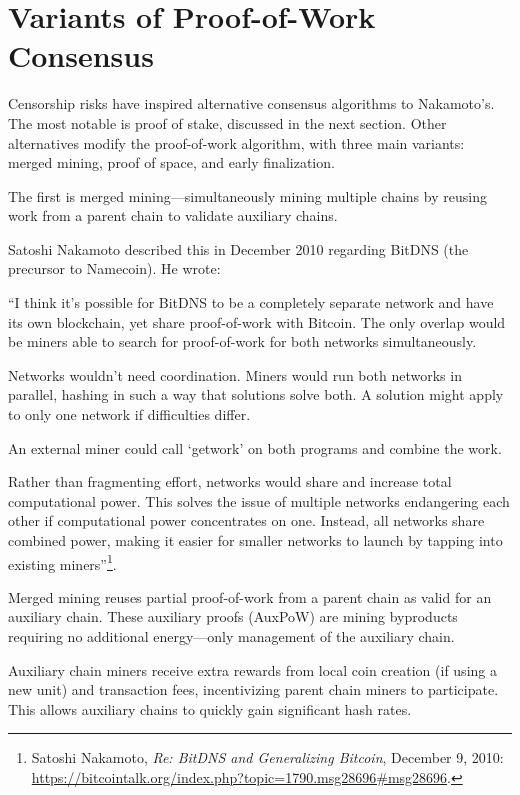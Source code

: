 \documentclass[
  a5paper,
  smalldemyvopaper,10pt,twoside,onecolumn,openright,extrafontsizes,hidelinks]{memoir}
\begin{document}
\section*{Variants of Proof-of-Work
Consensus}\label{les-variantes-des-consensus-par-preuve-de-travail}


Censorship risks have inspired alternative consensus algorithms to
Nakamoto's. The most notable is proof of stake, discussed in the next
section. Other alternatives modify the proof-of-work algorithm, with
three main variants: merged mining, proof of space, and early
finalization.

The first is merged mining---simultaneously mining multiple chains by
reusing work from a parent chain to validate auxiliary chains.

Satoshi Nakamoto described this in December 2010 regarding BitDNS (the
precursor to Namecoin). He wrote:

``I think it's possible for BitDNS to be a completely separate network
and have its own blockchain, yet share proof-of-work with Bitcoin. The
only overlap would be miners able to search for proof-of-work for both
networks simultaneously.

Networks wouldn't need coordination. Miners would run both networks in
parallel, hashing in such a way that solutions solve both. A solution
might apply to only one network if difficulties differ.

An external miner could call `getwork' on both programs and combine the
work.

Rather than fragmenting effort, networks would share and increase total
computational power. This solves the issue of multiple networks
endangering each other if computational power concentrates on one.
Instead, all networks share combined power, making it easier for smaller
networks to launch by tapping into existing miners''\footnote{Satoshi
  Nakamoto, \emph{Re: BitDNS and Generalizing Bitcoin}, December 9,
  2010:
  \url{https://bitcointalk.org/index.php?topic=1790.msg28696\#msg28696}.}.

Merged mining reuses partial proof-of-work from a parent chain as valid
for an auxiliary chain. These auxiliary proofs (AuxPoW) are mining
byproducts requiring no additional energy---only management of the
auxiliary chain.

Auxiliary chain miners receive extra rewards from local coin creation
(if using a new unit) and transaction fees, incentivizing parent chain
miners to participate. This allows auxiliary chains to quickly gain
significant hash rates.
\end{document}
